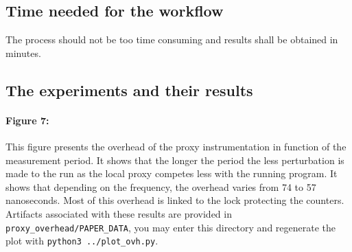 \subsection{Time needed for the workflow}

The process should not be too time consuming and results shall be obtained in minutes.

\subsection{The experiments and their results}

\paragraph*{\textbf{Figure 7:}} This figure presents the overhead of the proxy instrumentation in function of the measurement period. It shows that the longer the period the less perturbation is made to the run as the local proxy competes less with the running program. It shows that depending on the frequency, the overhead varies from 74 to 57 nanoseconds. Most of this overhead is linked to the lock protecting the counters. Artifacts associated with these results are provided in \texttt{proxy\_overhead/PAPER\_DATA}, you may enter this directory and regenerate the plot with \texttt{python3 ../plot\_ovh.py}.